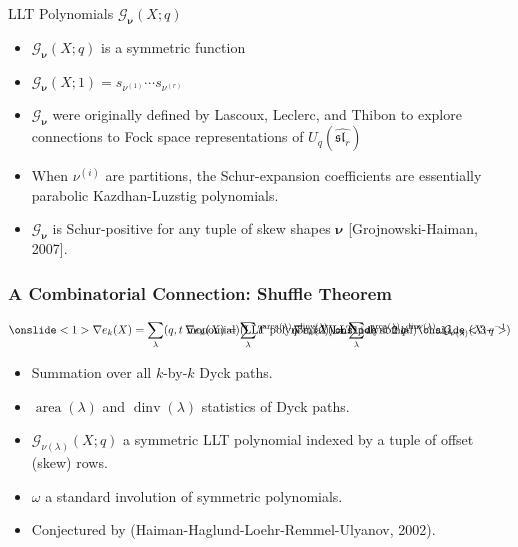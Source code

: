 \documentclass[dvipsnames]{beamer}
\newcommand{\Gcal}{{\mathcal G}}
\newcommand{\nubold}{{\boldsymbol \nu }}
\DeclareMathOperator{\dinv}{dinv}
\DeclareMathOperator{\area}{area}
\renewcommand{\sl}{\mathfrak{sl}}
\theoremstyle{definition}
\newcounter{c}
\begin{document}
\begin{frame}{LLT Polynomials \(\Gcal_\nubold(X;q)\)}
  \begin{itemize}
  \item \(\Gcal_\nubold(X;q)\) is a symmetric function\pause
  \item \(\Gcal_\nubold(X;1) = s_{\nu^{(1)}} \cdots s_{\nu^{(r)}}\)\pause
  \item \(\Gcal_\nubold\) were originally defined by Lascoux, Leclerc, and
    Thibon to explore connections to Fock space representations of \(U_q(\hat{\sl_r})\)\pause
  \item When \(\nu^{(i)}\) are partitions, the Schur-expansion
    coefficients are essentially parabolic Kazdhan-Luzstig polynomials.\pause
  \item \(\Gcal_\nubold\) is Schur-positive for any tuple of skew shapes \(\nubold\)
    [Grojnowski-Haiman, 2007].
  \end{itemize}
\end{frame}
\begin{frame}
  \frametitle{A Combinatorial Connection: Shuffle Theorem}
  \begin{theorem}
    \[
       \onslide<1>{\nabla e_k(X) = \sum_\lambda (q,t\text{ monomial})(\text{LLT polynomial})}
      \onslide<2>{\hspace{-20em}\nabla e_k(X) = \sum_\lambda
        t^{\area(\lambda)}q^{\dinv(\lambda)}(\text{LLT polynomial})}
      \onslide<3->{\hspace{-19em}\nabla e_k(X) = \sum_\lambda t^{\area(\lambda)}q^{\dinv(\lambda)}
        \omega \Gcal_{\nu(\lambda)}(X;q^{-1})}
    \]
  \end{theorem}
  \begin{itemize}
  \item Summation over all \(k\)-by-\(k\) Dyck paths.\pause
  \item \(\area(\lambda)\) and \(\dinv(\lambda)\) statistics of Dyck paths.\pause
  \item \(\Gcal_{\nu(\lambda)}(X;q)\) a symmetric LLT polynomial
    indexed by a tuple of offset (skew) rows. \pause
  \item \(\omega\) a standard involution of symmetric polynomials. \pause
  \item Conjectured by (Haiman-Haglund-Loehr-Remmel-Ulyanov, 2002).
  \end{itemize}
\end{frame}
\end{document}
